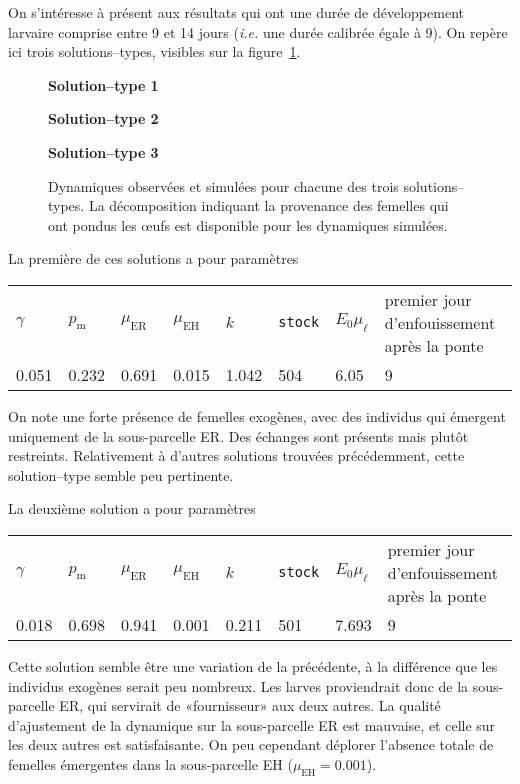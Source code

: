 On s'intéresse à présent aux résultats qui ont une durée de développement larvaire comprise entre 9 et 14 jours (\textit{i.e.} une durée calibrée égale à 9).
On repère ici trois solutions--types, visibles sur la figure~\ref{fig:E3}.

\begin{figure}[ht]
 \centering
 \textbf{Solution--type 1}
 
 
 \textbf{Solution--type 2}
 
 
 \textbf{Solution--type 3}
 
 \caption{Dynamiques observées et simulées pour chacune des trois solutions--types. La décomposition indiquant la provenance des femelles qui ont pondus les œufs est disponible pour les dynamiques simulées.}
 \label{fig:E3}
\end{figure}

La première de ces solutions a pour paramètres
\begin{center}
\small
\begin{tabular}{llllllll}
$\gamma$ & $p_{\text{m}}$ & $\mu_{\text{ER}}$ & $\mu_{\text{EH}}$ & $k$ & \texttt{stock} & $E_0\mu_\ell$ & premier jour d'enfouissement après la ponte\\
0.051 & 0.232 & 0.691 & 0.015 & 1.042 & 504 & 6.05 & 9
 \end{tabular}
\end{center}
On note une forte présence de femelles exogènes, avec des individus qui émergent uniquement de la sous-parcelle ER.
Des échanges sont présents mais plutôt restreints.
Relativement à d'autres solutions trouvées précédemment, cette solution--type semble peu pertinente.

La deuxième solution a pour paramètres
\begin{center}
\small
\begin{tabular}{llllllll}
$\gamma$ & $p_{\text{m}}$ & $\mu_{\text{ER}}$ & $\mu_{\text{EH}}$ & $k$ & \texttt{stock} & $E_0\mu_\ell$ & premier jour d'enfouissement après la ponte\\
0.018 & 0.698 & 0.941 & 0.001 & 0.211 & 501 & 7.693 & 9
 \end{tabular}
\end{center}
Cette solution semble être une variation de la précédente, à la différence que les individus exogènes serait peu nombreux. 
Les larves proviendrait donc de la sous-parcelle ER, qui servirait de «fournisseur» aux deux autres.
La qualité d'ajustement de la dynamique sur la sous-parcelle ER est mauvaise, et celle sur les deux autres est satisfaisante.
On peu cependant déplorer l'absence totale de femelles émergentes dans la sous-parcelle EH ($\mu_{\text{EH}} = 0.001$).

